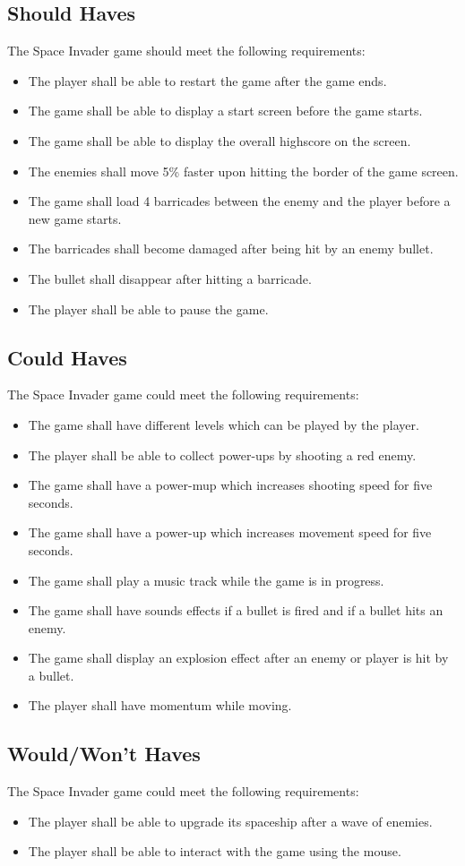 \subsection{Should Haves}
The Space Invader game should meet the following requirements:
\begin{itemize}
	\item The player shall be able to restart the game after the game ends.
	\item The game shall be able to display a start screen before the game starts.
	\item The game shall be able to display the overall highscore on the screen.
	\item The enemies shall move 5\% faster upon hitting the border of the game screen.
	\item The game shall load 4 barricades between the enemy and the player before a new game starts.
	\item The barricades shall become damaged after being hit by an enemy bullet.
	\item The bullet shall disappear after hitting a barricade.
	\item The player shall be able to pause the game.
\end{itemize}

\subsection{Could Haves}
The Space Invader game could meet the following requirements:
\begin{itemize}
	\item The game shall have different levels which can be played by the player.
	\item The player shall be able to collect power-ups by shooting a red enemy.
	\item The game shall have a power-mup which increases shooting speed for five seconds.
	\item The game shall have a power-up which increases movement speed for five seconds.
	\item The game shall play a music track while the game is in progress.
	\item The game shall have sounds effects if a bullet is fired and if a bullet hits an enemy.
	\item The game shall display an explosion effect after an enemy or player is hit by a bullet.
	\item The player shall have momentum while moving.
\end{itemize}

\subsection{Would/Won't Haves}
The Space Invader game could meet the following requirements:
\begin{itemize}
	\item The player shall be able to upgrade its spaceship after a wave of enemies.
	\item The player shall be able to interact with the game using the mouse.
\end{itemize}